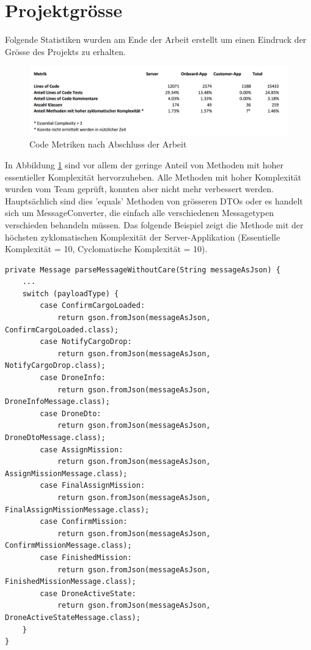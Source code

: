 \section{Projektgrösse}

Folgende Statistiken wurden am Ende der Arbeit erstellt um einen Eindruck der Grösse des Projekts zu erhalten.\\

\begin{figure}[H]
	\centering
	\includegraphics[width=1.0\textwidth] {images/code-metrics.png}
	\caption{Code Metriken nach Abschluss der Arbeit}
	\label{fig:code-metrics}
\end{figure}

In Abbildung \ref{fig:code-metrics} sind vor allem der geringe Anteil von Methoden mit hoher essentieller Komplexität\cite[S. 79]{MCCABE} hervorzuheben. Alle Methoden mit hoher Komplexität wurden vom Team geprüft, konnten aber nicht mehr verbessert werden. Hauptsächlich sind dies 'equals' Methoden von grösseren DTOs oder es handelt sich um MessageConverter, die einfach alle verschiedenen Messagetypen verschieden behandeln müssen. Das folgende Beispiel zeigt die Methode mit der höchsten zyklomatischen Komplexität der Server-Applikation (Essentielle Komplexität = 10, Cyclomatische Komplexität = 10). \\


\begin{lstlisting}
private Message parseMessageWithoutCare(String messageAsJson) {
	...
	switch (payloadType) {
		case ConfirmCargoLoaded:
			return gson.fromJson(messageAsJson, ConfirmCargoLoaded.class);
		case NotifyCargoDrop:
			return gson.fromJson(messageAsJson, NotifyCargoDrop.class);
		case DroneInfo:
			return gson.fromJson(messageAsJson, DroneInfoMessage.class);
		case DroneDto:
			return gson.fromJson(messageAsJson, DroneDtoMessage.class);
		case AssignMission:
			return gson.fromJson(messageAsJson, AssignMissionMessage.class);
		case FinalAssignMission:
			return gson.fromJson(messageAsJson, FinalAssignMissionMessage.class);
		case ConfirmMission:
			return gson.fromJson(messageAsJson, ConfirmMissionMessage.class);
		case FinishedMission:
			return gson.fromJson(messageAsJson, FinishedMissionMessage.class);
		case DroneActiveState:
			return gson.fromJson(messageAsJson, DroneActiveStateMessage.class);
	}
}

\end{lstlisting}


